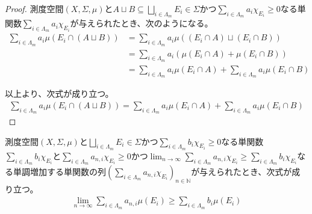 \documentclass[dvipdfmx]{jsarticle}
\begin{document}
\begin{proof}
測度空間$(X,\varSigma,\mu)$と$A \sqcup B \subseteq \bigsqcup_{i \in \varLambda_{m}} E_{i} \in \varSigma$かつ$\sum_{i \in \varLambda_{m}} {a_{i}\chi_{E_{i}}} \geq 0$なる単関数$\sum_{i \in \varLambda_{m}} {a_{i}\chi_{E_{i}}}$が与えられたとき、次のようになる。
\begin{align*}
\sum_{i \in \varLambda_{m}} {a_{i}\mu\left( E_{i} \cap (A \sqcup B) \right)} &= \sum_{i \in \varLambda_{m}} {a_{i}\mu\left( \left( E_{i} \cap A \right) \sqcup \left( E_{i} \cap B \right) \right)}\\
&= \sum_{i \in \varLambda_{m}} {a_{i}\left( \mu\left( E_{i} \cap A \right) + \mu\left( E_{i} \cap B \right) \right)}\\
&= \sum_{i \in \varLambda_{m}} {a_{i}\mu\left( E_{i} \cap A \right)} + \sum_{i \in \varLambda_{m}} {a_{i}\mu\left( E_{i} \cap B \right)}
\end{align*}\par
以上より、次式が成り立つ。
\begin{align*}
\sum_{i \in \varLambda_{m}} {a_{i}\mu\left( E_{i} \cap (A \sqcup B) \right)} = \sum_{i \in \varLambda_{m}} {a_{i}\mu\left( E_{i} \cap A \right)} + \sum_{i \in \varLambda_{m}} {a_{i}\mu\left( E_{i} \cap B \right)}
\end{align*}
\end{proof}
\begin{thm}\label{4.6.1.4}
測度空間$(X,\varSigma,\mu)$と$\bigsqcup_{i \in \varLambda_{m}} E_{i} \in \varSigma$かつ$\sum_{i \in \varLambda_{m}} {b_{i}\chi_{E_{i}}} \geq 0$なる単関数$\sum_{i \in \varLambda_{m}} {b_{i}\chi_{E_{i}}}$と$\sum_{i \in \varLambda_{m}} {a_{n,i}\chi_{E_{i}}} \geq 0$かつ$\lim_{n \rightarrow \infty}{\sum_{i \in \varLambda_{m}} {a_{n,i}\chi_{E_{i}}}} \geq \sum_{i \in \varLambda_{m}} {b_{i}\chi_{E_{i}}}$なる単調増加する単関数の列$\left( \sum_{i \in \varLambda_{m}} {a_{n,i}\chi_{E_{i}}} \right)_{n \in \mathbb{N}}$が与えられたとき、次式が成り立つ。
\begin{align*}
\lim_{n \rightarrow \infty}{\sum_{i \in \varLambda_{m}} {a_{n,i}\mu\left( E_{i} \right)}} \geq \sum_{i \in \varLambda_{m}} {b_{i}\mu\left( E_{i} \right)}
\end{align*}
\end{thm}
\end{document}
